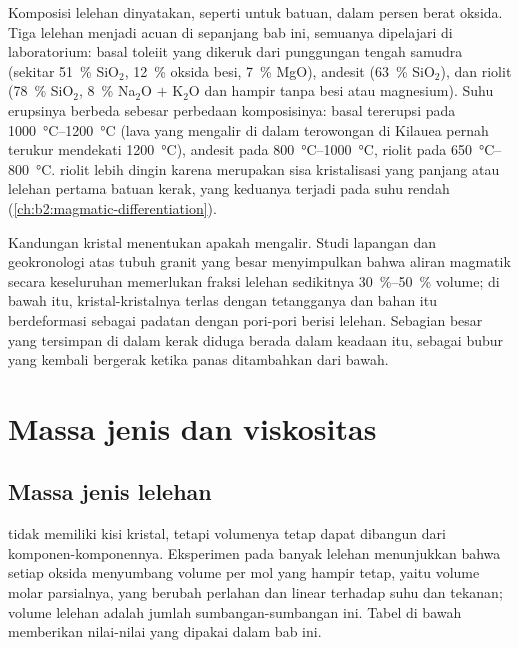 Komposisi lelehan dinyatakan, seperti untuk batuan, dalam persen berat
oksida. Tiga lelehan menjadi acuan di sepanjang bab ini, semuanya
dipelajari di laboratorium: basal toleiit yang dikeruk dari punggungan tengah samudra
(sekitar \qty{51}{\percent} SiO$_2$, \qty{12}{\percent} oksida besi, \qty{7}{\percent}
MgO), andesit (\qty{63}{\percent} SiO$_2$), dan riolit (\qty{78}{\percent}
SiO$_2$, \qty{8}{\percent} Na$_2$O $+$ K$_2$O dan hampir tanpa besi atau magnesium).
Suhu erupsinya berbeda sebesar perbedaan komposisinya: 
basal tererupsi pada \qtyrange{1000}{1200}{\celsius} (lava yang mengalir di dalam terowongan di
Kilauea pernah terukur mendekati \qty{1200}{\celsius}),  andesit pada
\qtyrange{800}{1000}{\celsius},  riolit pada \qtyrange{650}{800}{\celsius}.
 riolit lebih dingin karena merupakan sisa kristalisasi yang panjang
atau lelehan pertama batuan kerak, yang keduanya terjadi pada suhu rendah
(\cref{ch:b2:magmatic-differentiation}).

Kandungan kristal menentukan apakah  mengalir. Studi lapangan dan geokronologi
atas tubuh granit yang besar menyimpulkan bahwa aliran magmatik secara keseluruhan memerlukan fraksi
lelehan sedikitnya \qtyrange{30}{50}{\percent} volume; di bawah itu,
kristal-kristalnya terlas dengan tetangganya dan bahan itu berdeformasi sebagai padatan dengan
pori-pori berisi lelehan. Sebagian besar  yang tersimpan di dalam kerak diduga berada dalam
keadaan itu, sebagai bubur yang kembali bergerak ketika  panas ditambahkan dari
bawah.

\section{Massa jenis dan viskositas}

\subsection{Massa jenis lelehan}

 tidak memiliki kisi kristal, tetapi volumenya tetap dapat dibangun dari
komponen-komponennya. Eksperimen pada banyak lelehan menunjukkan bahwa setiap oksida menyumbang
volume per mol yang hampir tetap, yaitu volume molar parsialnya, yang berubah perlahan dan
linear terhadap suhu dan tekanan; volume lelehan adalah jumlah
sumbangan-sumbangan ini. Tabel di bawah memberikan nilai-nilai yang dipakai dalam bab ini.

